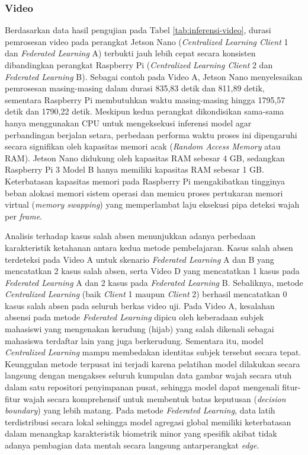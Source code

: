 \subsubsection{Video}

Berdasarkan data hasil pengujian pada Tabel \ref{tab:inferensi-video}, durasi pemrosesan video pada perangkat Jetson Nano (\textit{Centralized Learning Client} 1 dan \textit{Federated Learning} A) terbukti jauh lebih cepat secara konsisten dibandingkan perangkat Raspberry Pi (\textit{Centralized Learning Client} 2 dan \textit{Federated Learning} B). Sebagai contoh pada Video A, Jetson Nano menyelesaikan pemrosesan masing-masing dalam durasi 835,83 detik dan 811,89 detik, sementara Raspberry Pi membutuhkan waktu masing-masing hingga 1795,57 detik dan 1790,22 detik. Meskipun kedua perangkat dikondisikan sama-sama hanya menggunakan CPU untuk mengeksekusi inferensi model agar perbandingan berjalan setara, perbedaan performa waktu proses ini dipengaruhi secara signifikan oleh kapasitas memori acak (\textit{Random Access Memory} atau RAM). Jetson Nano didukung oleh kapasitas RAM sebesar 4 GB, sedangkan Raspberry Pi 3 Model B hanya memiliki kapasitas RAM sebesar 1 GB. Keterbatasan kapasitas memori pada Raspberry Pi mengakibatkan tingginya beban alokasi memori sistem operasi dan memicu proses pertukaran memori virtual (\textit{memory swapping}) yang memperlambat laju eksekusi pipa deteksi wajah per \textit{frame}.

Analisis terhadap kasus salah absen menunjukkan adanya perbedaan karakteristik ketahanan antara kedua metode pembelajaran. Kasus salah absen terdeteksi pada Video A untuk skenario \textit{Federated Learning} A dan B yang mencatatkan 2 kasus salah absen, serta Video D yang mencatatkan 1 kasus pada \textit{Federated Learning} A dan 2 kasus pada \textit{Federated Learning} B. Sebaliknya, metode \textit{Centralized Learning} (baik \textit{Client} 1 maupun \textit{Client} 2) berhasil mencatatkan 0 kasus salah absen pada seluruh berkas video uji. Pada Video A, kesalahan absensi pada metode \textit{Federated Learning} dipicu oleh keberadaan subjek mahasiswi yang mengenakan kerudung (hijab) yang salah dikenali sebagai mahasiswa terdaftar lain yang juga berkerudung. Sementara itu, model \textit{Centralized Learning} mampu membedakan identitas subjek tersebut secara tepat. Keunggulan metode terpusat ini terjadi karena pelatihan model dilakukan secara langsung dengan mengakses seluruh kumpulan data gambar wajah secara utuh dalam satu repositori penyimpanan pusat, sehingga model dapat mengenali fitur-fitur wajah secara komprehensif untuk membentuk batas keputusan (\textit{decision boundary}) yang lebih matang. Pada metode \textit{Federated Learning}, data latih terdistribusi secara lokal sehingga model agregasi global memiliki keterbatasan dalam menangkap karakteristik biometrik minor yang spesifik akibat tidak adanya pembagian data mentah secara langsung antarperangkat \textit{edge}.

